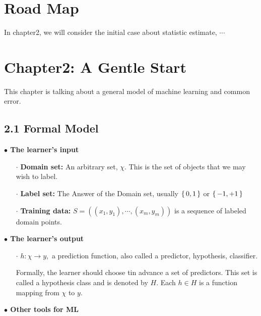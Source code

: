 


\cfoot{\thepage} %

\section*{Road Map}

In chapter2, we will consider the initial case about statistic estimate, $\cdots$

\section*{Chapter2: A Gentle Start}
This chapter is talking about a general model of machine learning and common error.

\subsection*{2.1 Formal Model} $ $\\

\textbf{$\bullet$ The learner's input}
	\begin{enumerate}
		\item[$\cdot$] \textbf{Domain set:} An arbitrary set, $\chi$. This is the set of objects that we may wish to label.
		\item[$\cdot$] \textbf{Label set:} The Answer of the Domain set, usually $\left\{ \,0,1 \,\right\}$ or $\left\{ \,-1,+1 \,\right\}$
		\item[$\cdot$] \textbf{Training data:} $S = ((x_1,y_1),\cdots,(x_m,y_m))$ is a sequence of labeled domain points.
	\end{enumerate}


\textbf{$\bullet$ The learner's output}
\begin{enumerate}
	\item[$\cdot$] $h:\chi \rightarrow y,$ a prediction function, also called a predictor, hypothesis, classifier.
	
	Formally, the learner should choose tin advance a set of predictors. This set is called a hypothesis class and is denoted by $H$. Each $h \in H$ is a function mapping from $\chi$ to $y$.
\end{enumerate}


\textbf{$\bullet$ Other tools for ML}

